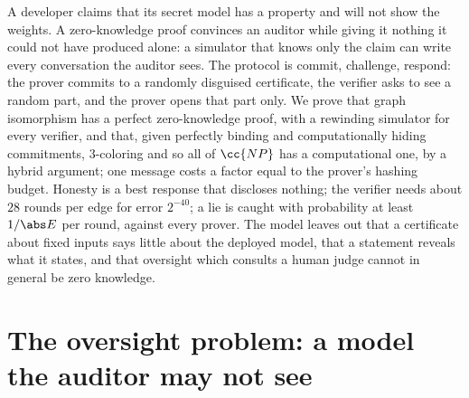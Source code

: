 \newcommand{\zeroknowledgecom}{\mathrm{Com}}
\newcommand{\zeroknowledgeview}{\mathrm{view}}
\newcommand{\zeroknowledgeaut}{\operatorname{Aut}}
\newcommand{\zeroknowledgeiso}{\operatorname{Iso}}
\newcommand{\zeroknowledgeadv}{\mathrm{adv}}
\newcommand{\zeroknowledgegood}{\mathrm{Good}}
\newcommand{\zeroknowledgesim}{\mathsf{S}}
\newcommand{\zeroknowledgescript}{\texttt{13-\allowbreak zeroknowledge-\allowbreak coloring.py}}

\begin{refsection}

\begin{chaptersummary}
A developer claims that its secret model has a property and will not show the weights. A zero-knowledge proof convinces an auditor while giving it nothing it could not have produced alone: a simulator that knows only the claim can write every conversation the auditor sees. The protocol is commit, challenge, respond: the prover commits to a randomly disguised certificate, the verifier asks to see a random part, and the prover opens that part only. We prove that graph isomorphism has a perfect zero-knowledge proof, with a rewinding simulator for every verifier, and that, given perfectly binding and computationally hiding commitments, 3-coloring and so all of $\cc{NP}$ has a computational one, by a hybrid argument; one message costs a factor equal to the prover's hashing budget. Honesty is a best response that discloses nothing; the verifier needs about $28$ rounds per edge for error $2^{-40}$; a lie is caught with probability at least $1/\abs E$ per round, against every prover. The model leaves out that a certificate about fixed inputs says little about the deployed model, that a statement reveals what it states, and that oversight which consults a human judge cannot in general be zero knowledge.
\end{chaptersummary}

\section{The oversight problem: a model the auditor may not see}\label{sec:zeroknowledge:problem}


\end{refsection}
